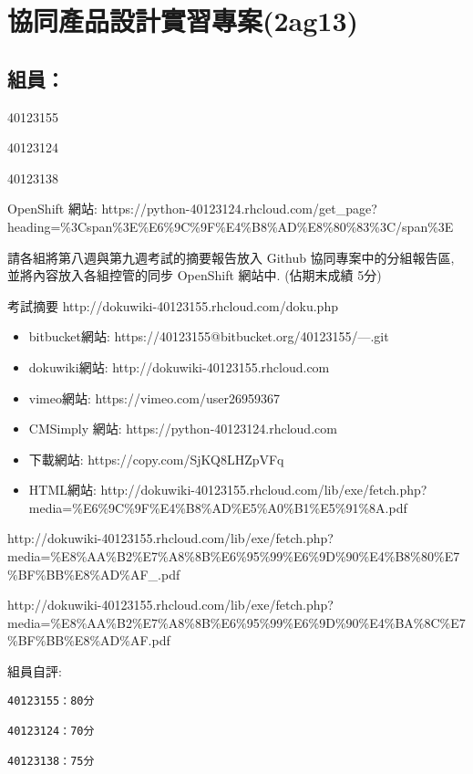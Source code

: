 \documentclass[]{article}
\begin{document}
\section{協同產品設計實習專案(2ag13)}\label{ux5354ux540cux7522ux54c1ux8a2dux8a08ux5be6ux7fd2ux5c08ux68482ag13}

\subsection{組員：}\label{ux7d44ux54e1-1}

40123155

40123124

40123138

OpenShift 網站:
https://python-40123124.rhcloud.com/get\_page?heading=\%3Cspan\%3E\%E6\%9C\%9F\%E4\%B8\%AD\%E8\%80\%83\%3C/span\%3E

請各組將第八週與第九週考試的摘要報告放入 Github 協同專案中的分組報告區,
並將內容放入各組控管的同步 OpenShift 網站中. (佔期末成績 5分)

考試摘要 http://dokuwiki-40123155.rhcloud.com/doku.php

\begin{itemize}
\item
  bitbucket網站: https://40123155@bitbucket.org/40123155/---.git
\item
  dokuwiki網站: http://dokuwiki-40123155.rhcloud.com
\item
  vimeo網站: https://vimeo.com/user26959367
\item
  CMSimply 網站: https://python-40123124.rhcloud.com
\item
  下載網站: https://copy.com/SjKQ8LHZpVFq
\item
  HTML網站:
  http://dokuwiki-40123155.rhcloud.com/lib/exe/fetch.php?media=\%E6\%9C\%9F\%E4\%B8\%AD\%E5\%A0\%B1\%E5\%91\%8A.pdf
\end{itemize}

http://dokuwiki-40123155.rhcloud.com/lib/exe/fetch.php?media=\%E8\%AA\%B2\%E7\%A8\%8B\%E6\%95\%99\%E6\%9D\%90\%E4\%B8\%80\%E7\%BF\%BB\%E8\%AD\%AF\_.pdf

http://dokuwiki-40123155.rhcloud.com/lib/exe/fetch.php?media=\%E8\%AA\%B2\%E7\%A8\%8B\%E6\%95\%99\%E6\%9D\%90\%E4\%BA\%8C\%E7\%BF\%BB\%E8\%AD\%AF.pdf

組員自評:

\begin{verbatim}
40123155：80分

40123124：70分

40123138：75分
\end{verbatim}
\end{document}
